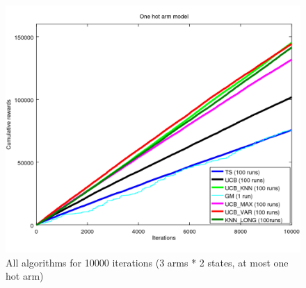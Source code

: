 \documentclass{article} %
\begin{document}
\begin{figure}[h]
	\begin{center}
		\includegraphics[width=1.0\textwidth]{all_10000it.png}
	\end{center}
	\caption{All algorithms for 10000 iterations (3 arms * 2 states, at most one hot arm)}
\end{figure}
\end{document}
